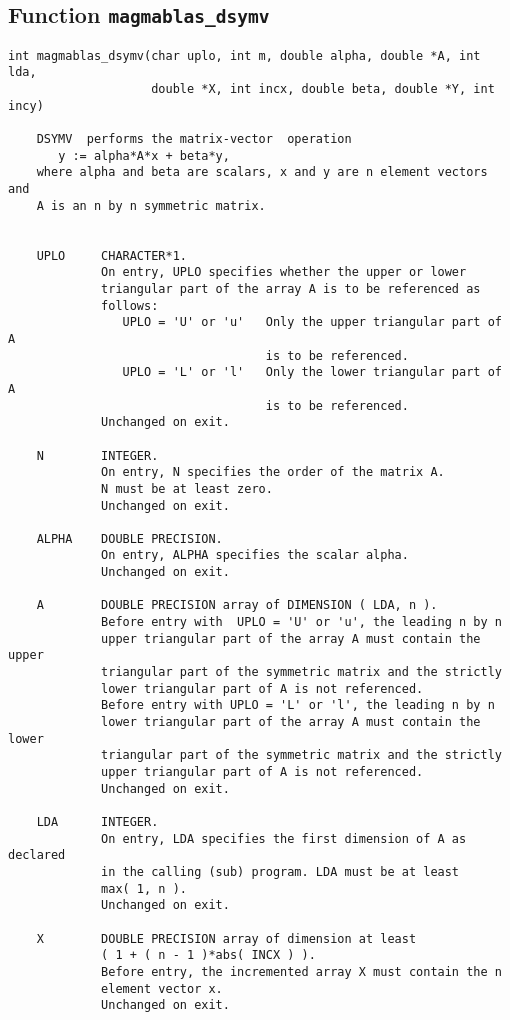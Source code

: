 \documentclass[10pt]{book}
\begin{document}
\subsection{Function {\tt {\bf magmablas\_dsymv}}}
\begin{verbatim}
int magmablas_dsymv(char uplo, int m, double alpha, double *A, int lda, 
                    double *X, int incx, double beta, double *Y, int incy)

    DSYMV  performs the matrix-vector  operation
       y := alpha*A*x + beta*y,
    where alpha and beta are scalars, x and y are n element vectors and
    A is an n by n symmetric matrix.

 
    UPLO     CHARACTER*1.
             On entry, UPLO specifies whether the upper or lower
             triangular part of the array A is to be referenced as
             follows:
                UPLO = 'U' or 'u'   Only the upper triangular part of A
                                    is to be referenced.
                UPLO = 'L' or 'l'   Only the lower triangular part of A
                                    is to be referenced.
             Unchanged on exit.

    N        INTEGER.
             On entry, N specifies the order of the matrix A.
             N must be at least zero.
             Unchanged on exit.

    ALPHA    DOUBLE PRECISION.
             On entry, ALPHA specifies the scalar alpha.
             Unchanged on exit.

    A        DOUBLE PRECISION array of DIMENSION ( LDA, n ).
             Before entry with  UPLO = 'U' or 'u', the leading n by n
             upper triangular part of the array A must contain the upper
             triangular part of the symmetric matrix and the strictly
             lower triangular part of A is not referenced.
             Before entry with UPLO = 'L' or 'l', the leading n by n
             lower triangular part of the array A must contain the lower
             triangular part of the symmetric matrix and the strictly
             upper triangular part of A is not referenced.
             Unchanged on exit.

    LDA      INTEGER.
             On entry, LDA specifies the first dimension of A as declared
             in the calling (sub) program. LDA must be at least
             max( 1, n ).
             Unchanged on exit.

    X        DOUBLE PRECISION array of dimension at least
             ( 1 + ( n - 1 )*abs( INCX ) ).
             Before entry, the incremented array X must contain the n
             element vector x.
             Unchanged on exit.


\end{verbatim}
\end{document}
